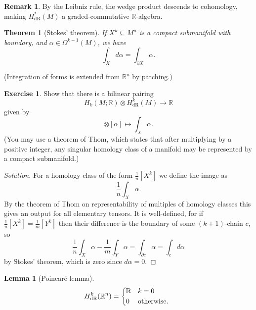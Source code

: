\documentclass{article}
\newtheorem*{theorem}{Theorem}
\newtheorem*{lemma}{Lemma}
\theoremstyle{definition}
\newtheorem*{remark}{Remark}
\newtheorem*{exercise}{Exercise}
\newcommand{\dR}{\mathrm{dR}}
\newcommand{\R}{\mathbb{R}}
\begin{document}
\begin{remark}
    By the Leibniz rule, the wedge product descends to cohomology, making
    $H^*_\dR(M)$ a graded-commutative $\R$-algebra.
\end{remark}

\begin{theorem}[Stokes' theorem]
    If $X^k\subseteq M^n$ is a compact submanifold with boundary, and
    $\alpha\in\Omega^{k-1}(M)$, we have
    \begin{equation*}
        \int_Xd\alpha = \int_{\partial X}\alpha.
    \end{equation*}
\end{theorem}

(Integration of forms is extended from $\R^n$ by patching.)

\begin{exercise}
    Show that there is a bilinear pairing
    \begin{equation*}
        H_k(M;\R)\otimes H^k_\dR(M)\to\R
    \end{equation*}
    given by
    \begin{equation*}
        [X^k]\otimes[\alpha]\mapsto\int_X\alpha.
    \end{equation*}
    (You may use a theorem of Thom, which states that after multiplying by a
    positive integer, any singular homology class of a manifold may be
    represented by a compact submanifold.)
\end{exercise}

\begin{proof}[Solution]
    For a homology class of the form $\frac{1}{n}[X^k]$ we define the image as
    \begin{equation*}
        \frac{1}{n}\int_X\alpha.
    \end{equation*}
    By the theorem of Thom on representability of multiples of homology classes
    this gives an output for all elementary tensors. It is well-defined, for if
    $\frac{1}{n}[X^k]=\frac{1}{m}[Y^k]$ then their difference is the boundary of
    some $(k+1)$-chain $c$, so
    \begin{equation*}
        \frac{1}{n}\int_X\alpha - \frac{1}{m}\int_Y\alpha
            = \int_{\partial c}\alpha
            = \int_cd\alpha
    \end{equation*}
    by Stokes' theorem, which is zero since $d\alpha=0$.
\end{proof}

\begin{lemma}[Poincar\'e lemma]
    \begin{equation*}
        H^k_\dR(\R^n) = \begin{dcases*}
            \R & $k=0$ \\
            0 & otherwise.
        \end{dcases*}
    \end{equation*}
\end{lemma}
\end{document}
